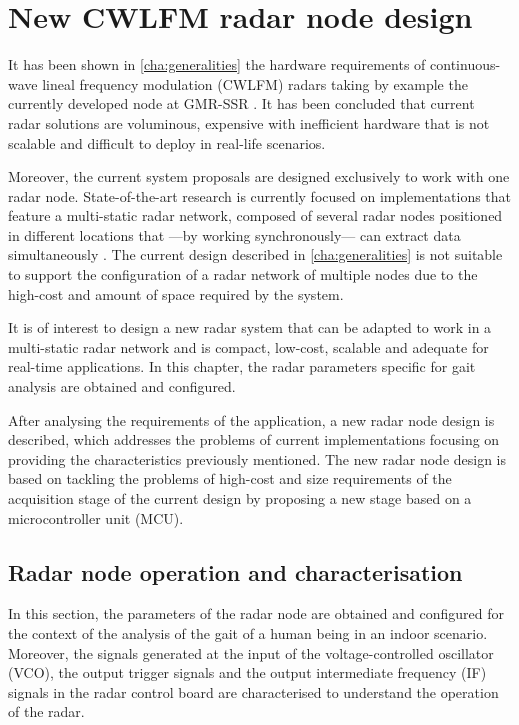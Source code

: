 \chapter{New CWLFM radar node design}\label{sec:continuous-wave-lineal-frequency-modulation-cwlfm-radars-for-gait-analysis}

It has been shown in \cref{cha:generalities} the hardware requirements of continuous-wave lineal frequency modulation (CWLFM) radars taking by example the currently developed node at GMR-SSR \cite{Sardinero2022, Montesano2019}. It has been concluded that current radar solutions are voluminous, expensive with inefficient hardware that is not scalable and difficult to deploy in real-life scenarios.

Moreover, the current system proposals are designed exclusively to work with one radar node. State-of-the-art research is currently focused on implementations that feature a multi-static radar network, composed of several radar nodes positioned in different locations that ---by working synchronously--- can extract data simultaneously \cite{Amin2017}. The current design described in \cref{cha:generalities} is not suitable to support the configuration of a radar network of multiple nodes due to the high-cost and amount of space required by the system.

It is of interest to design a new radar system that can be adapted to work in a multi-static radar network and is compact, low-cost, scalable and adequate for real-time applications. In this chapter, the radar parameters specific for gait analysis are obtained and configured.

After analysing the requirements of the application, a new radar node design is described, which addresses the problems of current implementations focusing on providing the characteristics previously mentioned. The new radar node design is based on tackling the problems of high-cost and size requirements of the acquisition stage of the current design by proposing a new stage based on a microcontroller unit (MCU).

\section{Radar node operation and characterisation}

In this section, the parameters of the radar node are obtained and configured for the context of the analysis of the gait of a human being in an indoor scenario. Moreover, the signals generated at the input of the voltage-controlled oscillator (VCO), the output trigger signals and the output intermediate frequency (IF) signals in the radar control board are characterised to understand the operation of the radar.

